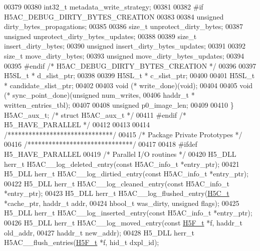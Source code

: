 \begin{DoxyCode}
00379 
00380     int32\_t metadata\_write\_strategy;
00381 
00382 \textcolor{preprocessor}{#if H5AC\_DEBUG\_DIRTY\_BYTES\_CREATION}
00383 
00384     \textcolor{keywordtype}{unsigned}    dirty\_bytes\_propagations;
00385 
00386     \textcolor{keywordtype}{size\_t}      unprotect\_dirty\_bytes;
00387     \textcolor{keywordtype}{unsigned}    unprotect\_dirty\_bytes\_updates;
00388 
00389     \textcolor{keywordtype}{size\_t}      insert\_dirty\_bytes;
00390     \textcolor{keywordtype}{unsigned}    insert\_dirty\_bytes\_updates;
00391 
00392     \textcolor{keywordtype}{size\_t}      move\_dirty\_bytes;
00393     \textcolor{keywordtype}{unsigned}    move\_dirty\_bytes\_updates;
00394 
00395 \textcolor{preprocessor}{#endif }\textcolor{comment}{/* H5AC\_DEBUG\_DIRTY\_BYTES\_CREATION */}\textcolor{preprocessor}{}
00396 
00397     H5SL\_t *    d\_slist\_ptr;
00398 
00399     H5SL\_t *    c\_slist\_ptr;
00400 
00401     H5SL\_t *    candidate\_slist\_ptr;
00402 
00403     void    (* write\_done)(void);
00404 
00405     void    (* sync\_point\_done)(\textcolor{keywordtype}{unsigned} num\_writes, 
00406                                     haddr\_t * written\_entries\_tbl);
00407 
00408     \textcolor{keywordtype}{unsigned}    p0\_image\_len;
00409 
00410 \} H5AC\_aux\_t; \textcolor{comment}{/* struct H5AC\_aux\_t */}
00411 \textcolor{preprocessor}{#endif }\textcolor{comment}{/* H5\_HAVE\_PARALLEL */}\textcolor{preprocessor}{}
00412 
00413 
00414 \textcolor{comment}{/******************************/}
00415 \textcolor{comment}{/* Package Private Prototypes */}
00416 \textcolor{comment}{/******************************/}
00417 
00418 \textcolor{preprocessor}{#ifdef H5\_HAVE\_PARALLEL}
00419 \textcolor{comment}{/* Parallel I/O routines */}
00420 H5\_DLL herr\_t H5AC\_\_log\_deleted\_entry(\textcolor{keyword}{const} H5AC\_info\_t *entry\_ptr);
00421 H5\_DLL herr\_t H5AC\_\_log\_dirtied\_entry(\textcolor{keyword}{const} H5AC\_info\_t *entry\_ptr);
00422 H5\_DLL herr\_t H5AC\_\_log\_cleaned\_entry(\textcolor{keyword}{const} H5AC\_info\_t *entry\_ptr);
00423 H5\_DLL herr\_t H5AC\_\_log\_flushed\_entry(\hyperlink{struct_h5_c__t}{H5C\_t} *cache\_ptr, haddr\_t addr,
00424     hbool\_t was\_dirty, \textcolor{keywordtype}{unsigned} flags);
00425 H5\_DLL herr\_t H5AC\_\_log\_inserted\_entry(\textcolor{keyword}{const} H5AC\_info\_t *entry\_ptr);
00426 H5\_DLL herr\_t H5AC\_\_log\_moved\_entry(\textcolor{keyword}{const} \hyperlink{struct_h5_f__t}{H5F\_t} *f, haddr\_t old\_addr,
00427     haddr\_t new\_addr);
00428 H5\_DLL herr\_t H5AC\_\_flush\_entries(\hyperlink{struct_h5_f__t}{H5F\_t} *f, hid\_t dxpl\_id);

\end{DoxyCode}

